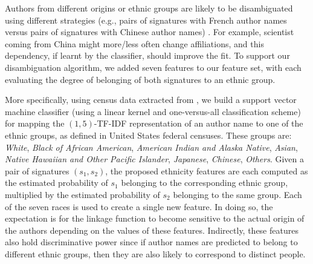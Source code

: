 \documentclass[runningheads,a4paper]{llncs}
\makeatletter
\newcommand*{\eg}{e.g.\@\xspace}
\newcommand{\longpage}{\enlargethispage{1.5\baselineskip}}
\makeatother
\begin{document}
Authors from different origins or ethnic groups are likely to be
disambiguated using different strategies (\eg, pairs of signatures with French
author names versus pairs of signatures with Chinese author names)
\cite{treeratpituk2012name, chin2014effective}. For example, scientist coming from China
might more/less often change affiliations, and this dependency, if learnt by the classifier, 
should improve the fit.
To support our disambiguation algorithm, we added seven features to our feature set, with each
evaluating the degree of belonging of both signatures to an ethnic group.


\longpage

More specifically, using census data extracted from \cite{rugglesintegrated},
we build a support vector machine classifier (using a linear kernel and
one-versus-all classification scheme) for mapping the
$(1,5)$-TF-IDF representation of an author name to one of the ethnic groups, as
defined in United States federal censuses. These groups are: \textit{White},
\textit{Black of African American}, \textit{American Indian and Alaska Native},
\textit{Asian}, \textit{Native Hawaiian and Other Pacific Islander},
\textit{Japanese}, \textit{Chinese}, \textit{Others}. Given a
pair of signatures $(s_1, s_2)$, the proposed ethnicity features are each
computed as the estimated probability of $s_1$ belonging to the corresponding
ethnic group, multiplied by the estimated probability of $s_2$ belonging to the
same group. Each of the seven races is used to create a single new feature.
In doing so, the expectation is for the linkage function to become
sensitive to the actual origin of the authors depending on the values of these
features. Indirectly, these features also hold discriminative
power since if author names are predicted to belong to different ethnic groups,
then they are also likely to correspond to distinct people.
\end{document}
